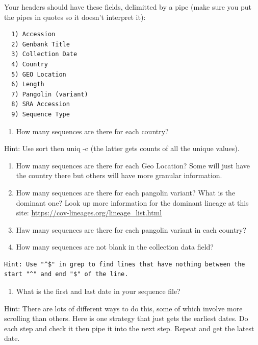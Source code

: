 \documentclass[
]{book}
\providecommand{\tightlist}{%
  \setlength{\itemsep}{0pt}\setlength{\parskip}{0pt}}
\begin{document}
Your headers should have these fields, delimitted by a pipe (make sure you put the pipes in quotes so it doesn't interpret it):

\begin{verbatim}
  1) Accession
  2) Genbank Title
  3) Collection Date
  4) Country
  5) GEO Location
  6) Length
  7) Pangolin (variant)
  8) SRA Accession
  9) Sequence Type
\end{verbatim}

\begin{enumerate}
\def\labelenumi{\arabic{enumi}.}
\setcounter{enumi}{3}
\tightlist
\item
  How many sequences are there for each country?
\end{enumerate}

Hint: Use sort then uniq -c (the latter gets counts of all the unique values).

\begin{enumerate}
\def\labelenumi{\arabic{enumi}.}
\setcounter{enumi}{4}
\item
  How many sequences are there for each Geo Location? Some will just have the country there but others will have more granular information.
\item
  How many sequences are there for each pangolin variant? What is the dominant one? Look up more information for the dominant lineage at this site: \url{https://cov-lineages.org/lineage_list.html}
\item
  Haw many sequences are there for each pangolin variant in each country?
\item
  How many sequences are not blank in the collection data field?
\end{enumerate}

\begin{verbatim}
Hint: Use "^$" in grep to find lines that have nothing between the start "^" and end "$" of the line.
\end{verbatim}

\begin{enumerate}
\def\labelenumi{\arabic{enumi}.}
\setcounter{enumi}{8}
\tightlist
\item
  What is the first and last date in your sequence file?
\end{enumerate}

Hint: There are lots of different ways to do this, some of which involve more scrolling than others. Here is one strategy that just gets the earliest dates. Do each step and check it then pipe it into the next step. Repeat and get the latest date.
\end{document}
